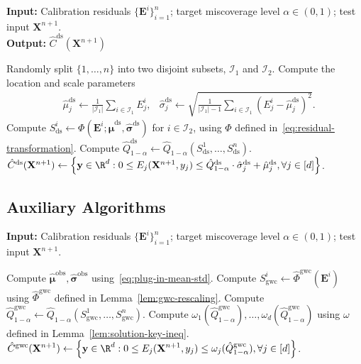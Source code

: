 \begin{algorithm}[!htb]
    \caption{Standardization with Data Splitting}
    \label{alg:std-ds}
    \textbf{Input:} Calibration residuals $\{\mathbf{E}^i\}_{i=1}^{n}$; target miscoverage level $\alpha\in(0,1)$; test input $\mathbf{X}^{n+1}$.\\
    \textbf{Output:} $\hat{C}^{\mathrm{ds}}(\mathbf{X}^{n+1})$
    \begin{algorithmic}[1]
        \State Randomly split $\{1,\ldots,n\}$ into two disjoint subsets, $\mathcal{I}_1$ and $\mathcal{I}_2$.
            \State Compute the location and scale parameters
            \begin{align*}
            & \hat{\mu}^{\mathrm{ds}}_j \gets \frac{1}{|\mathcal{I}_1|}\sum_{i \in \mathcal I_1}E^i_j,
              & \hat{\sigma}^{\mathrm{ds}}_j \gets \sqrt{\frac{1}{|\mathcal I_1|-1}\sum_{i \in \mathcal I_1}(E^i_j-\hat{\mu}^{\mathrm{ds}}_j)^2}.
            \end{align*}
        \EndFor
        \State Compute $S^i_{\mathrm{ds}} \gets \Phi(\mathbf{E}^i; \hat{\boldsymbol\mu}^{\mathrm{ds}},\hat{\boldsymbol\sigma}^{\mathrm{ds}})$ for $i \in \mathcal I_2$, using $\Phi$ defined in~\eqref{eq:residual-transformation}.
        \State Compute $\hat{Q}^\mathrm{ds}_{1-\alpha}\gets \hat{Q}_{1-\alpha}(S^1_\mathrm{ds},\dots, S^n_\mathrm{ds}).$
        \State \Return $\hat{C}^{\mathrm{ds}}(\mathbf{X}^{n+1}) \gets \left\{\mathbf y \in \R^d: 0 \leq E_j(\mathbf{X}^{n+1}, y_j) \leq \hat{Q}^\mathrm{ds}_{1-\alpha}\cdot \hat{\sigma}^\mathrm{ds}_j + \hat{\mu}^\mathrm{ds}_j, \forall j \in [d]\right\}$.
    \end{algorithmic}
\end{algorithm}

\FloatBarrier

\subsection{Auxiliary Algorithms}

\begin{algorithm}[!htb]
\caption{Global-Worst-Case TSCP (TSCP-GWC)}
\label{alg:global}
\textbf{Input:} Calibration residuals $\{\mathbf{E}^i\}_{i=1}^{n}$; target miscoverage level $\alpha\in(0,1)$; test input $\mathbf{X}^{n+1}$.
\begin{algorithmic}[1]
\State Compute $\hat{\boldsymbol\mu}^{\mathrm{obs}}, \hat{\boldsymbol\sigma}^{\mathrm{obs}}$ using~\eqref{eq:plug-in-mean-std}.
\State Compute $S^i_{\mathrm{gwc}}\gets \hat{\Phi}^{\mathrm{gwc}}(\mathbf{E}^i)$ using $\hat{\Phi}^{\mathrm{gwc}}$ defined in Lemma~\ref{lem:gwc-rescaling}.
\State Compute $\hat{Q}^{\mathrm{gwc}}_{1-\alpha} \gets \hat{Q}_{1-\alpha}(S^1_{\mathrm{gwc}},\dots, S^n_{\mathrm{gwc}})$.
\State Compute $\omega_1(\hat{Q}^{\mathrm{gwc}}_{1-\alpha}),\ldots,\omega_d(\hat{Q}^{\mathrm{gwc}}_{1-\alpha})$ using $\omega$ defined in Lemma~\ref{lem:solution-key-ineq}.
\State \Return $\displaystyle \hat{C}^{\mathrm{gwc}}(\mathbf{X}^{n+1}) \gets \left\{\mathbf y\in \R^d: 0\leq E_j(\mathbf{X}^{n+1}, y_j) \leq  \omega_j(\hat{Q}^{\mathrm{gwc}}_{1-\alpha}), \forall j \in [d]\right\}$.
\end{algorithmic} 
\end{algorithm}

